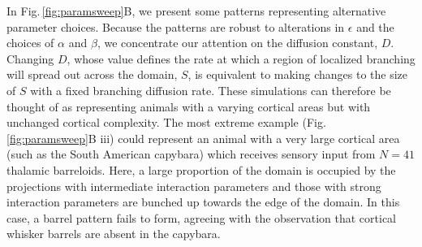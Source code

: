 \documentclass[9pt,lineno]{elife}
\newcommand{\MPthreePar}[1]{\textcolor{revbblack}{#1}}
\begin{document}
\MPthreePar{In Fig.\,\ref{fig:paramsweep}B, we present some patterns
  representing alternative parameter choices. Because the patterns are robust
  to alterations in $\epsilon$ and the choices of $\alpha$ and $\beta$, we
  concentrate our attention on the diffusion constant, $D$. Changing $D$,
  whose value defines the rate at which a region of localized branching will
  spread out across the domain, $S$, is equivalent to making changes to the
  size of $S$ with a fixed branching diffusion rate. These simulations can
  therefore be thought of as representing animals with a varying cortical
  areas but with unchanged cortical complexity. The most extreme example
  (Fig.\,\ref{fig:paramsweep}B iii) could represent an animal with a very
  large cortical area (such as the South American capybara) which receives
  sensory input from $N=41$ thalamic barreloids. Here, a large proportion of
  the domain is occupied by the projections with intermediate interaction
  parameters and those with strong interaction parameters are bunched up
  towards the edge of the domain. In this case, a barrel pattern fails to
  form, agreeing with the observation that cortical whisker barrels are absent
  in the capybara.}
\end{document}
